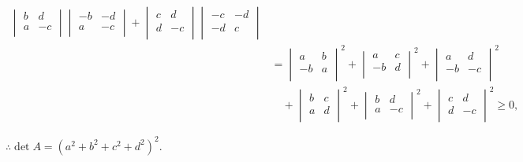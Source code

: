 \documentclass[color=black,device=normal,lang=cn,mode=geye]{elegantnote}
\begin{document}
\begin{solution}
\begin{align*}
\begin{vmatrix}
            b & d \\
            a & -c \\
        \end{vmatrix}\begin{vmatrix}
            -b & -d \\
            a  & -c \\
        \end{vmatrix}+\begin{vmatrix}
            c & d \\
            d & -c \\
        \end{vmatrix}\begin{vmatrix}
            -c & -d \\
            -d & c \\
        \end{vmatrix} \\
        & =\begin{vmatrix}
            a & b \\
            -b & a \\
        \end{vmatrix}^2+\begin{vmatrix}
            a & c \\
            -b & d \\
        \end{vmatrix}^2+\begin{vmatrix}
            a & d \\
            -b & -c \\
        \end{vmatrix}^2 \\
        & \quad+\begin{vmatrix}
            b & c \\
            a & d \\
        \end{vmatrix}^2+\begin{vmatrix}
            b & d \\
            a & -c \\
        \end{vmatrix}^2+\begin{vmatrix}
            c & d \\
            d & -c \\
        \end{vmatrix}^2\geq0,
    \end{align*}

    $\therefore\det A=(a^2+b^2+c^2+d^2)^2$.


\end{solution}
\end{document}
